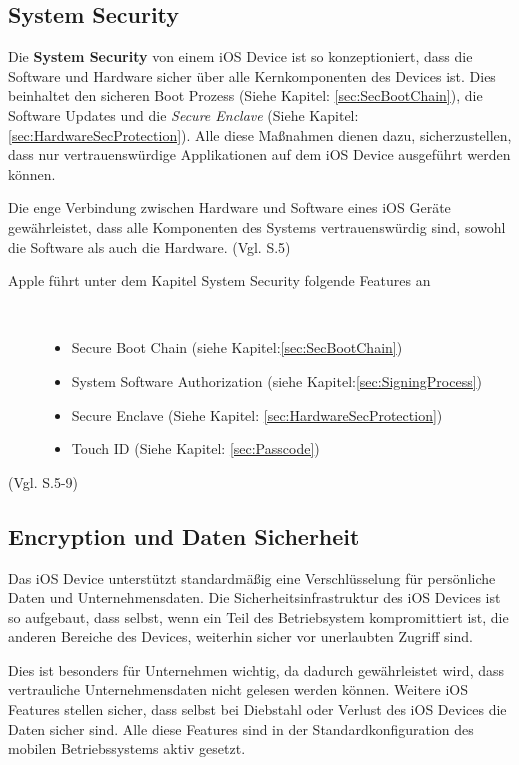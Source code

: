 \subsection{System Security}
\label{sec:SystemSec}
Die \textbf{System Security} von einem iOS Device ist so kon­zep­ti­o­nie­rt, dass die Software und Hardware sicher über alle Kernkomponenten des Devices ist. Dies beinhaltet den sicheren Boot Prozess (Siehe Kapitel: \ref{sec:SecBootChain}), die Software Updates und die \textit{\glqq Secure Enclave \grqq{}} (Siehe Kapitel: \ref{sec:HardwareSecProtection}). Alle diese Maßnahmen dienen dazu, sicherzustellen, dass nur vertrauenswürdige Applikationen auf dem iOS Device ausgeführt werden können.\par 

Die enge Verbindung zwischen Hardware und Software eines iOS Geräte gewährleistet, dass alle Komponenten des Systems vertrauenswürdig sind, sowohl die Software als auch die Hardware. (Vgl. \cite{Apple[4]} S.5)

\vspace*{1cm}

\begin{description}
\item[Apple führt unter dem Kapitel System Security folgende Features an]~\par
	\begin{itemize}
		\item Secure Boot Chain (siehe Kapitel:\ref{sec:SecBootChain})
 		\item System Software Authorization (siehe Kapitel:\ref{sec:SigningProcess})
 		\item Secure Enclave (Siehe Kapitel: \ref{sec:HardwareSecProtection})
 		\item Touch ID (Siehe Kapitel: \ref{sec:Passcode})
        \end{itemize}
\end{description}
(Vgl. \cite{Apple[4]} S.5-9)

\subsection{Encryption und Daten Sicherheit}
\label{sec:DataEnc}

Das iOS Device unterstützt standardmäßig eine Verschlüsselung für persönliche Daten und Unternehmensdaten. Die Sicherheitsinfrastruktur des iOS Devices ist so aufgebaut, dass selbst, wenn ein Teil des Betriebsystem kompromittiert ist, die anderen Bereiche des Devices, weiterhin sicher vor unerlaubten Zugriff sind. \par
Dies ist besonders für Unternehmen wichtig, da dadurch gewährleistet wird, dass vertrauliche Unternehmensdaten nicht gelesen werden können. Weitere iOS Features stellen sicher, dass selbst bei Diebstahl oder Verlust des iOS Devices die Daten sicher sind. Alle diese Features sind in der Standardkonfiguration des mobilen Betriebssystems aktiv gesetzt.

